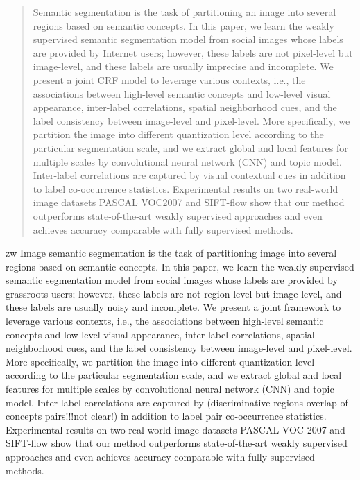 \begin{abstract}
Semantic segmentation is the task of partitioning an image into several regions based on semantic concepts. 
In this paper, we learn the weakly supervised semantic segmentation model from social images whose labels are provided by Internet users; however, these labels are not pixel-level but image-level, and these labels are usually imprecise and incomplete.
We present a joint CRF model to leverage various contexts, i.e., the associations between high-level semantic concepts and low-level visual appearance, inter-label correlations, spatial neighborhood cues, and the label consistency between image-level and pixel-level. 
More specifically, we partition the image into different quantization level according to the particular segmentation scale, and we extract global and local features for multiple scales by convolutional neural network (CNN) and topic model. 
Inter-label correlations are captured by visual contextual cues in addition to label co-occurrence statistics.
Experimental results on two real-world image datasets PASCAL VOC2007 and SIFT-flow show that our method outperforms state-of-the-art weakly supervised approaches and even achieves accuracy comparable with fully supervised methods.
\end{abstract}

\if zw
	Image semantic segmentation is the task of partitioning image into several regions based on semantic concepts.   In this paper, we learn the weakly supervised  semantic segmentation model from social images whose labels are  provided by grassroots users; however, these labels are not region-level but image-level, and these labels are usually noisy and incomplete.  We present a joint framework to leverage various contexts, i.e., the associations between high-level semantic concepts and low-level visual appearance, inter-label correlations, spatial neighborhood cues, and the label consistency between image-level and pixel-level. More specifically, we partition the image into different quantization level according to the particular segmentation scale, and we extract global and local features for multiple scales by convolutional neural network (CNN) and topic model. Inter-label correlations  are captured by (discriminative regions overlap of concepts pairs!!!not clear!) in addition to label pair co-occurrence statistics.   Experimental results on two real-world image datasets PASCAL VOC 2007 and SIFT-flow show that our method outperforms  state-of-the-art weakly supervised approaches and even achieves accuracy comparable with fully supervised methods.
\fi


